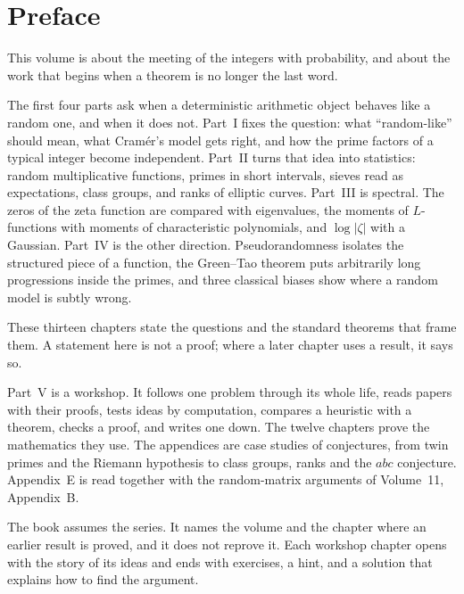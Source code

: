 \chapter*{Preface}
This volume is about the meeting of the integers with probability, and about the work that begins when a theorem is no longer the last word.

The first four parts ask when a deterministic arithmetic object behaves like a random one, and when it does not. Part~I fixes the question: what ``random-like'' should mean, what Cram\'er's model gets right, and how the prime factors of a typical integer become independent. Part~II turns that idea into statistics: random multiplicative functions, primes in short intervals, sieves read as expectations, class groups, and ranks of elliptic curves. Part~III is spectral. The zeros of the zeta function are compared with eigenvalues, the moments of $L$-functions with moments of characteristic polynomials, and $\log|\zeta|$ with a Gaussian. Part~IV is the other direction. Pseudorandomness isolates the structured piece of a function, the Green--Tao theorem puts arbitrarily long progressions inside the primes, and three classical biases show where a random model is subtly wrong.

These thirteen chapters state the questions and the standard theorems that frame them. A statement here is not a proof; where a later chapter uses a result, it says so.

Part~V is a workshop. It follows one problem through its whole life, reads papers with their proofs, tests ideas by computation, compares a heuristic with a theorem, checks a proof, and writes one down. The twelve chapters prove the mathematics they use. The appendices are case studies of conjectures, from twin primes and the Riemann hypothesis to class groups, ranks and the $abc$ conjecture. Appendix~E is read together with the random-matrix arguments of Volume~11, Appendix~B.

The book assumes the series. It names the volume and the chapter where an earlier result is proved, and it does not reprove it. Each workshop chapter opens with the story of its ideas and ends with exercises, a hint, and a solution that explains how to find the argument.
